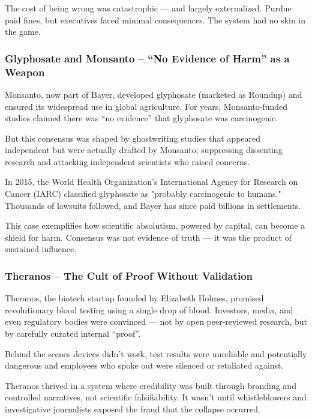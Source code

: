 \documentclass{article}
\begin{document}
The cost of being wrong was catastrophic — and largely externalized. Purdue paid fines, but executives faced minimal consequences. The system had no skin in the game.

\cite{CBSnewsPurduePharma}
\cite{PBSPurduePharma}
\cite{Alonso2021}

\subsubsection{Glyphosate and Monsanto – “No Evidence of Harm” as a Weapon}

Monsanto, now part of Bayer, developed glyphosate (marketed as Roundup) and ensured its widespread use in global agriculture. For years, Monsanto-funded studies claimed there was “no evidence” that glyphosate was carcinogenic.

But this consensus was shaped by ghostwriting studies that appeared independent but were actually drafted by Monsanto; suppressing dissenting research and attacking independent scientists who raised concerns.

In 2015, the World Health Organization’s International Agency for Research on Cancer (IARC) classified glyphosate as "probably carcinogenic to humans." Thousands of lawsuits followed, and Bayer has since 
paid billions in settlements.

This case exemplifies how scientific absolutism, powered by capital, can become a shield for harm. Consensus was not evidence of truth — it was the product of sustained influence.

\cite{GLENNA2021104290}
\cite{mindthegap2020}
\cite{ehn2018}

\subsubsection{Theranos – The Cult of Proof Without Validation}

Theranos, the biotech startup founded by Elizabeth Holmes, promised revolutionary blood testing using a
single drop of blood. Investors, media, and even regulatory bodies were convinced — not by open
peer-reviewed research, but by carefully curated internal “proof”.

Behind the scenes devices didn't work, test results were unreliable and potentially dangerous and employees who spoke out were silenced or retaliated against.

Theranos thrived in a system where credibility was built through branding and controlled narratives, not 
scientific falsifiability. It wasn't until whistleblowers and investigative journalists exposed the fraud
that the collapse occurred.
\end{document}
